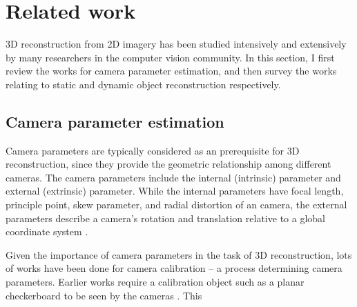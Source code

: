 \chapter{Related work}

3D reconstruction from 2D imagery has been studied intensively and extensively by many researchers in the computer vision community. In this section, I first review the works for camera parameter estimation, and then survey the works relating to static and dynamic object reconstruction respectively.

\section{Camera parameter estimation}
Camera parameters are typically considered as an prerequisite for 3D reconstruction, since they provide the geometric relationship among different cameras.
The camera parameters include the  internal (intrinsic) parameter and external (extrinsic) parameter. While the internal parameters have focal length, principle point, skew parameter, and radial distortion of an camera, the external parameters describe a camera's rotation and translation relative to a global coordinate system \cite{Hartley2004}. 

Given the importance of camera parameters in the task of 3D reconstruction, lots of works have been done for camera calibration -- a process determining camera parameters. 
Earlier works require a calibration object such as a planar checkerboard to be seen by the cameras \cite{conf/cvpr/SturmM99,zhang2000flexible,caltoolbox}. 
This 


